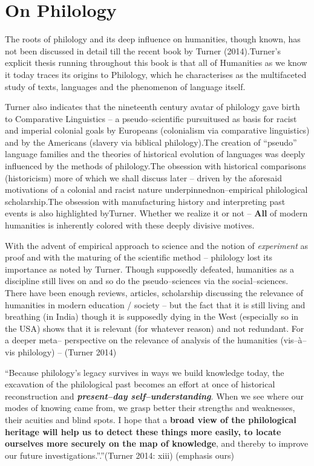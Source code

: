 \section*{On Philology}

The roots of philology and its deep influence on humanities, though known, has not been discussed in detail till the recent book by Turner (2014).Turner’s explicit thesis running throughout this book is that all of Humanities as we know it today traces its origins to Philology, which he characterises as the multifaceted study of texts, languages and the phenomenon of language itself.

Turner also indicates that the nineteenth century avatar of philology gave birth to Comparative Linguistics – a pseudo–scientific pursuit\break used as basis for racist and imperial colonial goals by Europeans (colonialism via comparative linguistics) and by the Americans (slavery via biblical philology).The creation of “pseudo” language families and the theories of historical evolution of languages was deeply influenced by the methods of philology.The obsession with historical comparisons (historicism) more of which we shall discuss later – driven by the aforesaid motivations of a colonial and racist nature underpinned\break non–empirical philological scholarship.The obsession with manufacturing history and interpreting past events is also highlighted by\break Turner. Whether we realize it or not – \textbf{All} of modern humanities is inherently colored with these deeply divisive motives.

With the advent of empirical approach to science and the notion of \textit{experiment} as proof and with the maturing of the scientific method – philology lost its importance as noted by Turner. Though supposedly defeated, humanities as a discipline still lives on and so do the pseudo–sciences via the social–sciences. There have been enough reviews, articles, scholarship discussing the relevance of humanities in modern education / society – but the fact that it is still living and breathing (in India) though it is supposedly dying in the West (especially so in the USA) shows that it is relevant (for whatever reason) and not redundant. For a deeper meta– perspective on the relevance of analysis of the humanities (vis–à–vis philology) – (Turner 2014)

\begin{myquote}
“Because philology’s legacy survives in ways we build knowledge today, the excavation of the philological past becomes an effort at once of historical reconstruction and \textbf{\textit{present–day self–understanding}}. When we see where our modes of knowing came from, we grasp better their strengths and weaknesses, their acuities and blind spots. I hope that a \textbf{broad view of the philological heritage will help us to detect these things more easily, to locate ourselves more securely on the map of knowledge}, and thereby to improve our future investigations.”.”\hfill (Turner 2014: xiii) (emphasis ours)
\end{myquote}


